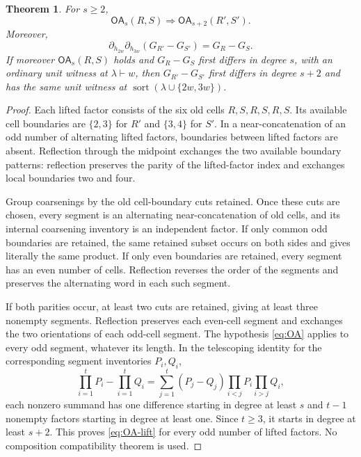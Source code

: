 \documentclass[11pt,a4paper]{amsart}
\numberwithin{equation}{section}
\theoremstyle{plain}
\newtheorem{theorem}{Theorem}[section]
\theoremstyle{definition}
\newcommand{\sort}{\operatorname{sort}}
\newcommand{\OA}{\mathsf{OA}}
\begin{document}
\begin{theorem}\label{thm:lift}
For \(s\ge2\),
\begin{equation}\label{eq:OA-lift}
\OA_s(R,S)\Longrightarrow\OA_{s+2}(R',S').
\end{equation}
Moreover,
\begin{equation}\label{eq:lift-extraction}
\partial_{h_{2w}}\partial_{h_{3w}}(G_{R'}-G_{S'})=G_R-G_S.
\end{equation}
If moreover \(\OA_s(R,S)\) holds and \(G_R-G_S\) first differs in degree
\(s\), with an ordinary unit witness at \(\lambda\vdash w\), then
\(G_{R'}-G_{S'}\) first differs in degree \(s+2\) and has the same unit
witness at \(\sort(\lambda\cup\{2w,3w\})\).
\end{theorem}
\begin{proof}
Each lifted factor consists of the six old cells
\(R,S,R,S,R,S\).  Its available cell boundaries are \(\{2,3\}\) for \(R'\)
and \(\{3,4\}\) for \(S'\).  In a near-concatenation of an odd number of alternating lifted factors,
boundaries between lifted factors are absent.  Reflection through the
midpoint exchanges the two available boundary patterns: reflection
preserves the parity of the lifted-factor index and exchanges local
boundaries two and four.

Group coarsenings by the old cell-boundary cuts retained.  Once these
cuts are chosen, every segment is an alternating near-concatenation of old cells,
and its internal coarsening inventory is an independent factor.
If only common odd boundaries are retained, the same retained subset
occurs on both sides and gives literally the same product.
If only even boundaries are retained, every segment has an even number
of cells.  Reflection reverses the order of the segments and preserves
the alternating word in each such segment.

If both parities occur, at least two cuts are retained, giving at least
three nonempty segments.  Reflection preserves each even-cell segment and
exchanges the two orientations of each odd-cell segment.  The hypothesis
\eqref{eq:OA} applies to every odd segment, whatever its length.  In the
telescoping identity for the corresponding segment inventories \(P_i,Q_i\),
\[
\prod_{i=1}^tP_i-\prod_{i=1}^tQ_i
=\sum_{j=1}^t(P_j-Q_j)
\prod_{i<j}P_i\prod_{i>j}Q_i,
\]
each nonzero summand has one difference starting in degree at least \(s\)
and \(t-1\) nonempty factors starting in degree at least one.
Since \(t\ge3\), it starts in degree at least \(s+2\).
This proves \eqref{eq:OA-lift} for every odd
number of lifted factors.  No composition compatibility theorem is used.


\end{proof}
\end{document}
